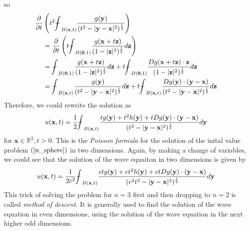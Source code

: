 \documentclass[10pt]{article}
\def\rr{{\mathbb R}}
\def\vc{{\mathbf x}}
\def\vcc{{\mathbf y}}
\def\vccc{{\mathbf z}}
\newcommand\tbbint{{-\mkern -16mu\int}}
\newcommand\dbbint{{-\mkern -19mu\int}}
\newcommand\bbint{
{\mathchoice{\dbbint}{\tbbint}{\tbbint}{\tbbint}}
}
\begin{document}
so
\begin{align*}
    \frac{\partial}{\partial t}&\left(t^2 \bbint_{B(\vc,t)}\frac{g(\vcc)}{(t^2-|\vcc-\vc|^2)^{\frac{1}{2}}}\right)\\
    &= \frac{\partial}{\partial t}\left(t \bbint_{B(\mathbf{0},1)} \frac{g(\vc+t\vccc)}{(1-|\vccc|^2)^{\frac{1}{2}}} d\vccc\right)\\
    &= \bbint_{B(\mathbf{0},1)} \frac{g(\vc+t\vccc)}{(1-|\vccc|^2)^{\frac{1}{2}}} d\vccc + t \bbint_{B(\mathbf{0},1)} \frac{ D g(\vc+t\vccc)\cdot \vccc}{(1-|\vccc|^2)^{\frac{1}{2}}} d\vccc\\
    &= \bbint_{B(\vc,t)} \frac{g(\vcc)}{(t^2-|\vcc-\vc|^2)^{\frac{1}{2}}} d\vccc + t \bbint_{B(\vc,t)} \frac{ D g(\vcc)\cdot (\vcc-\vc)}{(t^2-|\vcc-\vc|^2)^{\frac{1}{2}}} d\vccc\\
\end{align*}
Therefore, we could rewrite the solution as
\begin{equation}
    \label{PF}
    u(\vc,t) = \frac{1}{2}\bbint_{B(\vc,t)} \frac{t g(\vcc)+t^2h(\vcc)+t D g(\vcc)\cdot(\vcc-\vc)}{(t^2-|\vcc-\vc|^2)^{\frac{1}{2}}} d\vcc
\end{equation}
for $\vc \in \rr^2, t > 0$. This is the \textit{Poisson formula} for the solution of the inital value problem $(\ref{n_sphere})$ in two dimensions. Again, by making a change of variables, we could see that the solution of the wave equaiton in two dimensions is given by
\begin{equation*}
    u(\vc,t) = \frac{1}{2 c^2} \bbint_{B(\vc,t)} \frac{ct g(\vcc)+ct^2h(\vcc)+c t D g(\vcc)\cdot(\vcc-\vc)}{(c^2t^2-|\vcc-\vc|^2)^{\frac{1}{2}}} d\vcc
\end{equation*}
 This trick of solving the problem for $n=3$ first and then dropping to $n=2$ is called \textit{method of descent}. It is generally used to find the solution of the wave equation in even dimensions, using the solution of the wave equation in the next higher odd dimensions.
\end{document}
